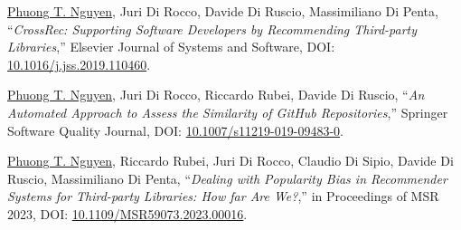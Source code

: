 \documentclass[a4paper,8pt]{article} %
\begin{document}
\begin{thebibliography}{100}
	
%	
	\underline{Phuong T. Nguyen}, Juri Di Rocco, Davide Di Ruscio, Massimiliano Di Penta, ``\emph{CrossRec: Supporting Software Developers by Recommending Third-party Libraries},'' Elsevier Journal of Systems and Software,  DOI: \href{https://doi.org/10.1016/j.jss.2019.110460}{10.1016/j.jss.2019.110460}.	
	
	\underline{Phuong T. Nguyen}, Juri Di Rocco, Riccardo Rubei, Davide Di Ruscio, ``\emph{An Automated Approach to Assess the Similarity of GitHub Repositories},'' Springer Software Quality Journal, DOI: \href{https://doi.org/10.1007/s11219-019-09483-0}{10.1007/s11219-019-09483-0}.





	
	\underline{Phuong T. Nguyen}, Riccardo Rubei, Juri Di Rocco, Claudio Di Sipio, Davide Di Ruscio, Massimiliano Di Penta, ``\emph{Dealing with Popularity Bias in Recommender Systems for Third-party Libraries: How far Are We?},'' in Proceedings %
	of MSR 2023, %
	DOI: \href{https://doi.org/10.1109/MSR59073.2023.00016}{10.1109/MSR59073.2023.00016}.%
	

\end{thebibliography}
\end{document}
